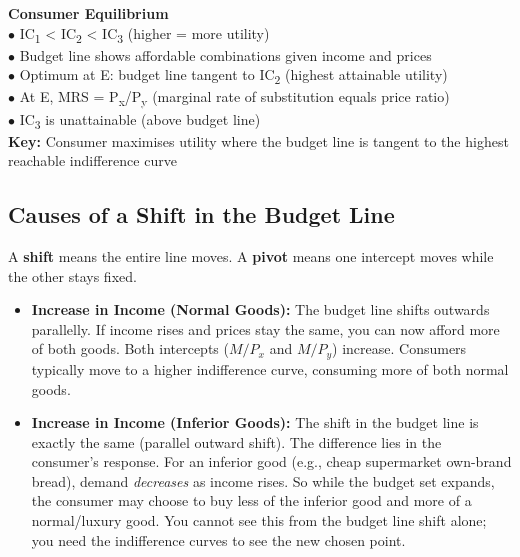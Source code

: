 \documentclass[11pt, a4paper, twoside]{book}
\begin{document}
\begin{diagrambox}
{%
}{%
\textbf{\color{NavyPrimary}Consumer Equilibrium}\\[4pt]
$\bullet$ IC\textsubscript{1} < IC\textsubscript{2} < IC\textsubscript{3} (higher = more utility)\\[2pt]
$\bullet$ Budget line shows affordable combinations given income and prices\\[2pt]
$\bullet$ Optimum at E: budget line tangent to IC\textsubscript{2} (highest attainable utility)\\[2pt]
$\bullet$ At E, MRS = P\textsubscript{x}/P\textsubscript{y} (marginal rate of substitution equals price ratio)\\[2pt]
$\bullet$ IC\textsubscript{3} is unattainable (above budget line)\\[2pt]
\textbf{\color{GoldAccent}Key:} Consumer maximises utility where the budget line is tangent to the highest reachable indifference curve%
}
\end{diagrambox}

\subsection{Causes of a Shift in the Budget Line}

A \textbf{shift} means the entire line moves. A \textbf{pivot} means one intercept moves while the other stays fixed.

\begin{itemize}
  \item \textbf{Increase in Income (Normal Goods):} The budget line shifts outwards parallelly. If income rises and prices stay the same, you can now afford more of both goods. Both intercepts ($M/P_x$ and $M/P_y$) increase. Consumers typically move to a higher indifference curve, consuming more of both normal goods.
  \item \textbf{Increase in Income (Inferior Goods):} The shift in the budget line is exactly the same (parallel outward shift). The difference lies in the consumer's response. For an inferior good (e.g., cheap supermarket own-brand bread), demand \emph{decreases} as income rises. So while the budget set expands, the consumer may choose to buy less of the inferior good and more of a normal/luxury good. You cannot see this from the budget line shift alone; you need the indifference curves to see the new chosen point.
\end{itemize}
\end{document}

